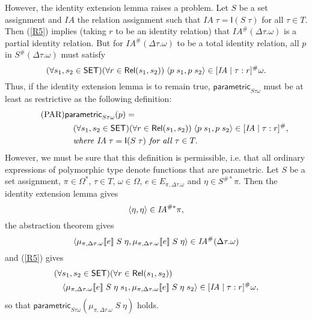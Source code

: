 \documentclass[sigplan,screen,nonacm,balance=false]{acmart}
\makeatletter
\theoremstyle{plain}
\DeclarePairedDelimiter{\pair}{\langle}{\rangle}
\DeclarePairedDelimiter{\interp}{\llbracket}{\rrbracket}
\newcommand{\ie}{i.e.\@\xspace}
\newcommand{\Rel}{\mathsf{Rel}}
\newcommand{\Id}{\mathsf{I}}
\newcommand{\SET}{\mathsf{SET}}
\newcommand{\para}{\mathsf{parametric}}
\newcommand{\IA}{\mathit{IA}}
\makeatother
\begin{document}
However, the identity extension lemma raises a problem.
Let $S$ be a set assignment and $\IA$ the relation assignment such that $\IA \; \tau = \Id(S \; \tau)$ for all $\tau \in T$.
Then (\ref{R5}) implies (taking $r$ to be an identity relation) that $\IA^\#(\Delta \tau. \omega)$ is a partial identity relation.
But for $\IA^\#(\Delta \tau. \omega)$ to be a total identity relation, all $p$ in $S^\#(\Delta \tau. \omega)$ must satisfy
%
\begin{equation*}
  (\forall s_1, s_2 \in \SET) (\forall r \in \Rel(s_1, s_2)) \; \pair{p \; s_1, p \; s_2} \in [\IA \mid \tau: r]^\# \omega.
\end{equation*}
%
Thus, if the identity extension lemma is to remain true, $\para_{S \tau \omega}$ must be at least as restrictive as the following definition:
%
\begin{align*}\tag{PAR}\label{PAR}
  & \para_{S \tau \omega}(p) = \\
  & \quad (\forall s_1, s_2 \in \SET) (\forall r \in \Rel(s_1, s_2)) \; \pair{p \; s_1, p \; s_2} \in [\IA \mid \tau: r]^\#, \\
  & \quad \textit{where } \IA \; \tau = \Id(S \; \tau) \textit{ for all } \tau \in T.
\end{align*}
%
However, we must be sure that this definition is permissible, \ie that all ordinary expressions of polymorphic type denote functions that are parametric.
Let $S$ be a set assignment, $\pi \in \Omega^*$, $\tau \in T$, $\omega \in \Omega$, $e \in E_{\pi, \Delta \tau. \omega}$ and $\eta \in S^{\#*} \pi$.
Then the identity extension lemma gives
%
\begin{equation*}
  \pair{\eta, \eta} \in \IA^{\#*} \pi,
\end{equation*}
%
the abstraction theorem gives
%
\begin{equation*}
  \pair{\mu_{\pi, \Delta \tau. \omega} \interp{e} \; S \; \eta, \mu_{\pi, \Delta \tau. \omega} \interp{e} \; S \; \eta} \in \IA^\#(\Delta \tau. \omega)
\end{equation*}
%
and (\ref{R5}) gives
%
\begin{align*}
  & (\forall s_1, s_2 \in \SET) (\forall r \in \Rel(s_1, s_2)) \\
  & \quad \pair{\mu_{\pi, \Delta \tau. \omega} \interp{e} \; S \; \eta \; s_1, \mu_{\pi, \Delta \tau. \omega} \interp{e} \; S \; \eta \; s_2} \in [\IA \mid \tau: r] ^\# \omega,
\end{align*}
%
so that $\para_{S \tau \omega}(\mu_{\pi, \Delta \tau. \omega} \; S \; \eta)$ holds.
\end{document}
